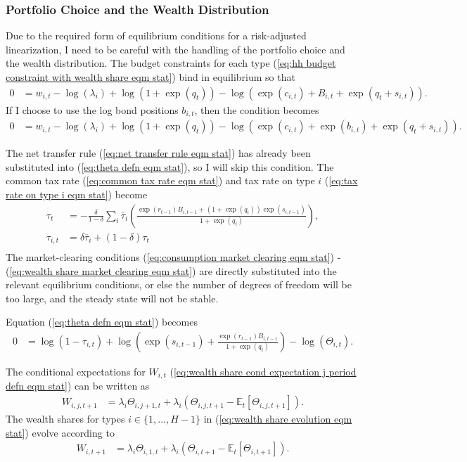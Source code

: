 \documentclass[12 pt, oneside]{article}
\theoremstyle{definition}
\theoremstyle{definition}
\theoremstyle{definition}
\newcommand{\E}{\mathbb{E}}
\begin{document}
\subsubsection{Portfolio Choice and the Wealth Distribution}
Due to the required form of equilibrium conditions for a risk-adjusted linearization, I need to be careful with the handling of the portfolio choice and the wealth distribution.
The budget constraints for each type (\ref{eq:hh budget constraint with wealth share eqm stat}) bind in equilibrium so that
\begin{align*}
  0 & = w_{i, t} - \log(\lambda_i) + \log(1 + \exp(q_t)) - \log(\exp(c_{i, t}) + B_{i, t} + \exp(q_t + s_{i, t})).
\end{align*}
If I choose to use the log bond positions $b_{i, t}$, then the condition becomes
\begin{align*}
  0 & = w_{i, t} - \log(\lambda_i) + \log(1 + \exp(q_t)) - \log(\exp(c_{i, t}) + \exp(b_{i, t}) + \exp(q_t + s_{i, t})).
\end{align*}

The net transfer rule (\ref{eq:net transfer rule eqm stat}) has already been substituted into (\ref{eq:theta defn eqm stat}),
so I will skip this condition. The common tax rate (\ref{eq:common tax rate eqm stat}) and tax rate on type $i$ (\ref{eq:tax rate on type i eqm stat}) become
\begin{align*}
  \tau_t & = -\frac{\delta}{1 - \delta}\sum_i \overline{\tau}_i\left(\frac{\exp(r_{t - 1})B_{i, t - 1} + (1 + \exp(q_t))\exp(s_{i, t - 1})}{1 + \exp(q_t)}\right),\\
  \tau_{i, t} & = \delta \overline{\tau}_i + (1 - \delta)\tau_t\\
\end{align*}
The market-clearing conditions (\ref{eq:consumption market clearing eqm stat}) - (\ref{eq:wealth share market clearing eqm stat}) are directly substituted into the relevant equilibrium conditions, or
else the number of degrees of freedom will be too large, and the steady state will not be stable.

Equation (\ref{eq:theta defn eqm stat}) becomes
\begin{align*}
  0 & = \log(1 - \tau_{i, t}) + \log\left(\exp(s_{i, t - 1}) + \frac{\exp(r_{t - 1}) B_{i, t - 1}}{1 + \exp(q_t)}\right) - \log(\Theta_{i, t}).
\end{align*}

The conditional expectations for $W_{i, t}$ (\ref{eq:wealth share cond expectation j period defn eqm stat}) can be written as
\begin{align*}
  W_{i, j, t + 1} & = \lambda_i\Theta_{i, j + 1, t} + \lambda_i(\Theta_{i, j, t + 1} - \E_t[\Theta_{i, j, t + 1}]).
\end{align*}
The wealth shares for types $i \in \{1,\dots, H - 1\}$ in (\ref{eq:wealth share evolution eqm stat}) evolve according to
\begin{align*}
  W_{i, t + 1} & = \lambda_i\Theta_{i, 1, t} + \lambda_i(\Theta_{i, t + 1} - \E_t[\Theta_{i, t + 1}]).
\end{align*}
\end{document}
